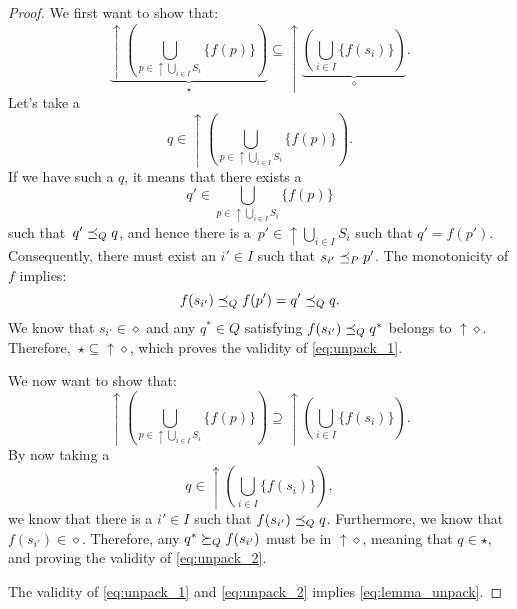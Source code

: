 \begin{proof}
We first want to show that:
\begin{equation}
\label{eq:unpack_1}
    \underbrace{\uparrow \left(\bigcup_{p\in \uparrow \bigcup_{i\in I}S_i}\{f(p)\} \right)}_{\star}\subseteq \uparrow \underbrace{\left( \bigcup_{i\in I}\{f(s_i)\}\right)}_{\diamond}.
\end{equation}
Let's take a
\begin{equation}
    q\in \uparrow\left( \bigcup_{p\in \uparrow \bigcup_{i\in I}S_i}\{f(p)\}\right).
\end{equation}
If we have such a $q$, it means that there exists a
\begin{equation}
    q'\in \bigcup_{p\in \uparrow\bigcup_{i\in I}S_i}\{f(p)\}
\end{equation}
such that~$q'\preceq_Q q$, and hence there is a~$p'\in \uparrow \bigcup_{i\in I} S_i$ such that $q'=f(p')$. Consequently, there must exist an $i'\in I$ such that $s_{i'}\preceq_P p'$. The monotonicity of $f$ implies:
\begin{equation}
    f(s_{i'})\preceq_Q f(p')=q'\preceq_Q q.
\end{equation}
We know that $s_{i'}\in \diamond$ and any $q^*\in Q$ satisfying $f(s_{i'})\preceq_Q q^*$ belongs to $\uparrow \diamond$. Therefore,~$\star\subseteq \uparrow \diamond$, which proves the validity of \cref{eq:unpack_1}.

We now want to show that:
\begin{equation}
\label{eq:unpack_2}
    \uparrow \left(\bigcup_{p\in \uparrow \bigcup_{i\in I}S_i}\{f(p)\} \right)\supseteq \uparrow \left( \bigcup_{i\in I}\{f(s_i)\}\right).
\end{equation}
By now taking a
\begin{equation}
    q\in \uparrow \left( \bigcup_{i\in I}\{f(s_i)\}\right),
\end{equation}
we know that there is a $i'\in I$ such that $f(s_{i'})\preceq_Q q$. Furthermore, we know that $f(s_{i'})\in \diamond$. Therefore, any $q^*\succeq_Q f(s_{i'})$ must be in $\uparrow \diamond$, meaning that $q\in \star$, and proving the validity of \cref{eq:unpack_2}.

The validity of \cref{eq:unpack_1} and \cref{eq:unpack_2} implies \cref{eq:lemma_unpack}.
\end{proof}

